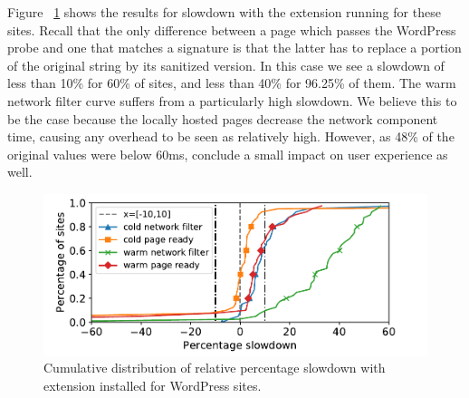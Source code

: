 Figure ~\ref{fig:wordpress_slowdown} shows the results for slowdown with the extension running for these sites. Recall that the only difference between a page which passes the WordPress probe and one that matches a signature is that the latter has to replace a portion of the original string by its sanitized version. In this case we see a slowdown of less than 10\% for 60\% of sites, and less than 40\% for 96.25\% of them. The warm network filter curve suffers from a particularly high slowdown. We believe this to be the case because the locally hosted pages decrease the network component time, causing any overhead to be seen as relatively high. However, as 48\% of the original values were below 60ms, conclude a small impact on user experience as well.

\begin{figure}[h]
	\includegraphics[scale=0.5]{results/extension_slowdown_wordpress_small.pdf}
	\caption{Cumulative distribution of relative percentage slowdown with extension installed for WordPress sites.}
	\label{fig:wordpress_slowdown}
\end{figure}

